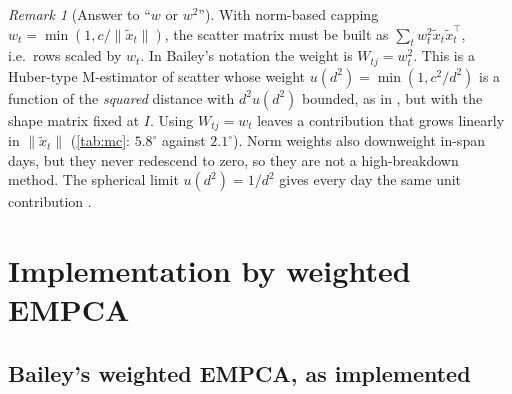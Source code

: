 \documentclass[11pt]{article}
\theoremstyle{definition}
\theoremstyle{remark}
\newtheorem{remark}[theorem]{Remark}
\newcommand{\norm}[1]{\lVert #1\rVert}
\newcommand{\tx}{\tilde{x}}
\begin{document}
\begin{remark}[Answer to ``$w$ or $w^2$'']
With norm-based capping $w_t=\min(1,c/\norm{\tx_t})$, the scatter matrix must be built as
$\sum_tw_t^2\tx_t\tx_t^\top$, i.e.\ rows scaled by $w_t$. In Bailey's notation the weight is $W_{tj}=w_t^2$.
This is a Huber-type M-estimator of scatter whose weight $u(d^2)=\min(1,c^2/d^2)$ is a function of the
\emph{squared} distance with $d^2u(d^2)$ bounded, as in \citet{Maronna1976}, but with the shape matrix fixed at $I$.
Using $W_{tj}=w_t$ leaves a contribution that grows linearly in $\norm{\tx_t}$ (\cref{tab:mc}: $5.8^\circ$ against
$2.1^\circ$). Norm weights also downweight in-span days, but they never redescend to zero, so they are not a
high-breakdown method. The spherical limit $u(d^2)=1/d^2$ gives every day the same unit contribution \citep{Locantore1999}.
\end{remark}

\section{Implementation by weighted EMPCA}\label{sec:empca}

\subsection{Bailey's weighted EMPCA, as implemented}
\end{document}
